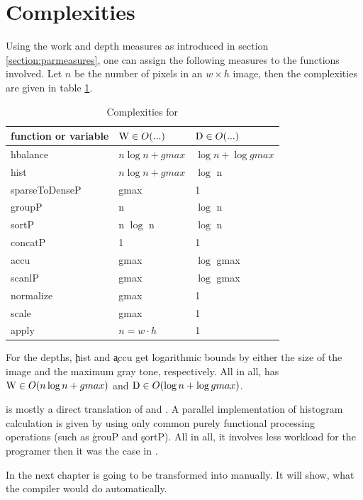 \section{Complexities}
  Using the work and depth measures as introduced in section \ref{section:parmeasures},
  one can assign the following measures to the functions involved.
  Let $n$ be the number of pixels in an $w \times h$ image,
  then the complexities are given in table \ref{complexities:ndpn}.
  \begin{table}[h!]
    \caption{Complexities for \ndpn}
    \label{complexities:ndpn}
    \begin{center}
    \begin{tabular}{lll}
        \toprule
        function or variable & $\textrm{W} \in O(...)$           & $\textrm{D} \in O(...)$ \\
        \midrule
        hbalance        & $n \log n + gmax$   & $\log n + \log gmax$\\
        \midrule
        hist            & $n \log n + gmax$    & $\log$ n \\
        sparseToDenseP  & gmax                 & 1 \\
        groupP          & n                    & $\log$ n \\
        sortP           & n $\log$ n             & $\log$ n \\
        concatP         & 1                    & 1 \\
        \midrule
        accu            & gmax                 & $\log$ gmax \\
        scanlP          & gmax                 & $\log$ gmax \\
        \midrule
        normalize       & gmax                 & 1 \\
        scale           & gmax                 & 1 \\
        \midrule
        apply           & $n = w \cdot h$ & 1 \\
    \end{tabular}
    \end{center}
  \end{table}
    For the depths, \c{hist} and \c{accu} get logarithmic bounds by
    either the size of the image and the maximum gray tone, respectively.
    All in all, \ndpn has $\textrm{W} \in O(n \log n + gmax)$
    and $\textrm{D} \in O(\log n + \log gmax)$.
    
    \ndpn is mostly a direct translation of \seq and \algo.
    A parallel implementation of histogram calculation is given
    by using only common purely functional processing operations (such as \c{grouP} and \c{sortP}).
    All in all, it involves less workload for the programer then it was
    the case in \man.
    
    
    In the next chapter \ndpn is going to be transformed into \ndpv
    manually. It will show, what the compiler would do automatically.
  
  
